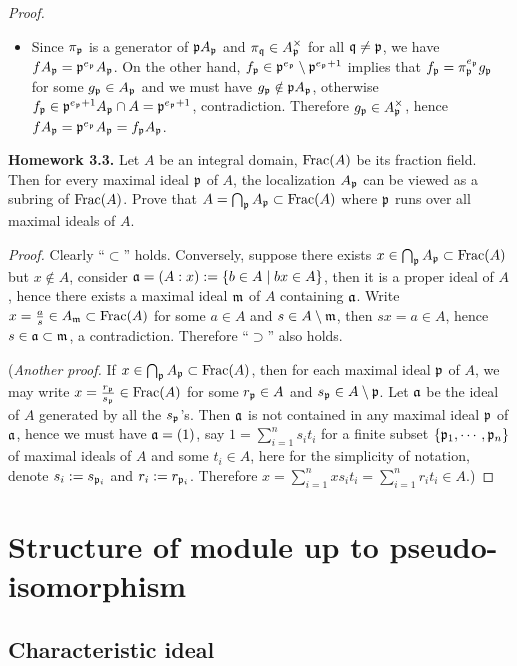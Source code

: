 \begin{proof}
\begin{itemize}
\item
Since $\pi_{\mathfrak{p}}$ is a generator of ${\mathfrak{p}} A_{\mathfrak{p}}$
and $\pi_{\mathfrak{q}}\in A_{\mathfrak{p}}^\times$ for all ${\mathfrak{q}}\neq{\mathfrak{p}}$,
we have $fA_{\mathfrak{p}}={\mathfrak{p}}^{e_{\mathfrak{p}}}A_{\mathfrak{p}}$.
On the other hand, $f_{\mathfrak{p}}\in{\mathfrak{p}}^{e_{\mathfrak{p}}}\setminus{\mathfrak{p}}^{e_{\mathfrak{p}}+1}$ implies that
$f_{\mathfrak{p}}=\pi_{\mathfrak{p}}^{e_{\mathfrak{p}}}g_{\mathfrak{p}}$ for some $g_{\mathfrak{p}}\in A_{\mathfrak{p}}$
and we must have $g_{\mathfrak{p}}\notin{\mathfrak{p}} A_{\mathfrak{p}}$, otherwise $f_{\mathfrak{p}}\in{\mathfrak{p}}^{e_{\mathfrak{p}}+1}A_{\mathfrak{p}}\cap A={\mathfrak{p}}^{e_{\mathfrak{p}}+1}$, contradiction. Therefore $g_{\mathfrak{p}}\in A_{\mathfrak{p}}^\times$,
hence $fA_{\mathfrak{p}}={\mathfrak{p}}^{e_{\mathfrak{p}}}A_{\mathfrak{p}}=f_{\mathfrak{p}} A_{\mathfrak{p}}$.
\end{itemize}

\textbf{Homework 3.3.}
Let $A$ be an integral domain, ${\mathrm{Frac}}(A)$ be its fraction field.
Then for every maximal ideal ${\mathfrak{p}}$ of $A$,
the localization $A_{\mathfrak{p}}$ can be viewed as a subring of ${\mathrm{Frac}}(A)$.
Prove that $A=\bigcap_{\mathfrak{p}} A_{\mathfrak{p}}\subset{\mathrm{Frac}}(A)$
where ${\mathfrak{p}}$ runs over all maximal ideals of $A$.

\emph{Proof.}
Clearly ``$\subset$'' holds.
Conversely, suppose there exists $x\in\bigcap_{\mathfrak{p}} A_{\mathfrak{p}}\subset{\mathrm{Frac}}(A)$
but $x\notin A$,
consider ${\mathfrak{a}}=(A:x):=\{b\in A\mid bx\in A\}$,
then it is a proper ideal of $A$,
hence there exists a maximal ideal ${\mathfrak{m}}$ of $A$ containing ${\mathfrak{a}}$.
Write $x=\frac as\in A_{\mathfrak{m}}\subset{\mathrm{Frac}}(A)$
for some $a\in A$ and $s\in A\setminus{\mathfrak{m}}$,
then $sx=a\in A$, hence $s\in{\mathfrak{a}}\subset{\mathfrak{m}}$, a contradiction.
Therefore ``$\supset$'' also holds.

(\emph{Another proof.}
If $x\in\bigcap_{\mathfrak{p}} A_{\mathfrak{p}}\subset{\mathrm{Frac}}(A)$,
then for each maximal ideal ${\mathfrak{p}}$ of $A$,
we may write $x=\frac{r_{\mathfrak{p}}}{s_{\mathfrak{p}}}\in{\mathrm{Frac}}(A)$ for some $r_{\mathfrak{p}}\in A$
and $s_{\mathfrak{p}}\in A\setminus{\mathfrak{p}}$. Let ${\mathfrak{a}}$ be the ideal of $A$ generated by all the $s_{\mathfrak{p}}$'s.
Then ${\mathfrak{a}}$ is not contained in any maximal ideal ${\mathfrak{p}}$ of ${\mathfrak{a}}$,
hence we must have ${\mathfrak{a}}=(1)$, say $1=\sum_{i=1}^ns_it_i$
for a finite subset $\{{\mathfrak{p}}_1,\cdots,{\mathfrak{p}}_n\}$ of maximal ideals of $A$
and some $t_i\in A$, here for the simplicity of notation, denote
$s_i:=s_{{\mathfrak{p}}_i}$ and $r_i:=r_{{\mathfrak{p}}_i}$.
Therefore $x=\sum_{i=1}^nxs_it_i=\sum_{i=1}^nr_it_i\in A$.)
\end{proof}
\fi

\section{Structure of module up to pseudo-isomorphism}

\subsection{Characteristic ideal}

